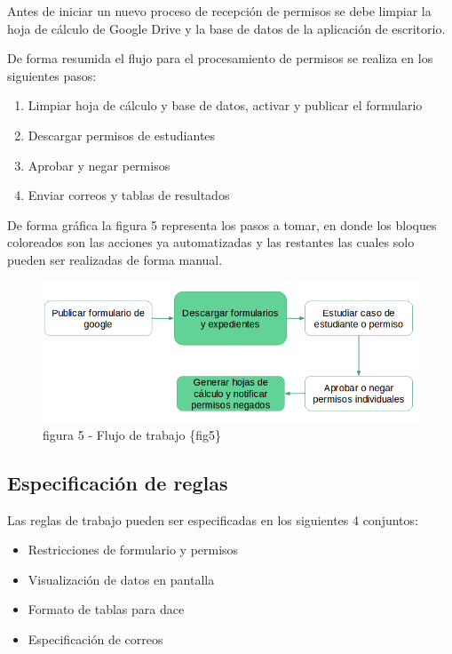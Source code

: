 \documentclass[]{article}
\begin{document}
Antes de iniciar un nuevo proceso de recepción de permisos se debe
limpiar la hoja de cálculo de Google Drive y la base de datos de la
aplicación de escritorio.

De forma resumida el flujo para el procesamiento de permisos se realiza
en los siguientes pasos:

\begin{enumerate}
\def\labelenumi{\arabic{enumi}.}
\itemsep1pt\parskip0pt
\item
  Limpiar hoja de cálculo y base de datos, activar y publicar el
  formulario
\item
  Descargar permisos de estudiantes
\item
  Aprobar y negar permisos
\item
  Enviar correos y tablas de resultados
\end{enumerate}

De forma gráfica la figura 5 representa los pasos a tomar, en donde los
bloques coloreados son las acciones ya automatizadas y las restantes las
cuales solo pueden ser realizadas de forma manual.

\begin{figure}[htbp]
\centering
\includegraphics{flujo.png}
\caption{figura 5 - Flujo de trabajo \{fig5\}}
\end{figure}

\subsection{Especificación de reglas}\label{especificaciuxf3n-de-reglas}

Las reglas de trabajo pueden ser especificadas en los siguientes 4
conjuntos:

\begin{itemize}
\itemsep1pt\parskip0pt
\item
  Restricciones de formulario y permisos
\item
  Visualización de datos en pantalla
\item
  Formato de tablas para dace
\item
  Especificación de correos
\end{itemize}
\end{document}
